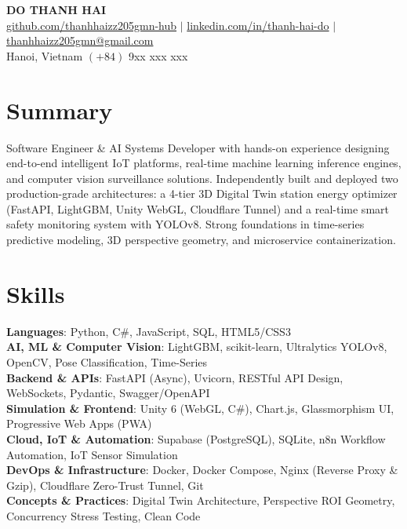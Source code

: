 \documentclass[letterpaper,10pt]{article}
\begin{document}
\begin{center}
    \textbf{\Huge \scshape DO THANH HAI} \\ \vspace{4pt}
    \small 
    \href{https://github.com/thanhhaizz205gmn-hub}{github.com/thanhhaizz205gmn-hub} $|$ 
    \href{https://linkedin.com/in/thanh-hai-do}{linkedin.com/in/thanh-hai-do} $|$ 
    \href{mailto:thanhhaizz205gmn@gmail.com}{thanhhaizz205gmn@gmail.com} \\ \vspace{2pt}
    \small Hanoi, Vietnam \quad $(+84)$ 9xx xxx xxx
\end{center}

\section{Summary}
\small{
Software Engineer \& AI Systems Developer with hands-on experience designing end-to-end intelligent IoT platforms, real-time machine learning inference engines, and computer vision surveillance solutions. Independently built and deployed two production-grade architectures: a 4-tier 3D Digital Twin station energy optimizer (FastAPI, LightGBM, Unity WebGL, Cloudflare Tunnel) and a real-time smart safety monitoring system with YOLOv8. Strong foundations in time-series predictive modeling, 3D perspective geometry, and microservice containerization.
}

\section{Skills}
\begin{itemize}[leftmargin=0.15in, label={}]
    \small{\item{
     \textbf{Languages}{: Python, C\#, JavaScript, SQL, HTML5/CSS3} \\
     \textbf{AI, ML \& Computer Vision}{: LightGBM, scikit-learn, Ultralytics YOLOv8, OpenCV, Pose Classification, Time-Series} \\
     \textbf{Backend \& APIs}{: FastAPI (Async), Uvicorn, RESTful API Design, WebSockets, Pydantic, Swagger/OpenAPI} \\
     \textbf{Simulation \& Frontend}{: Unity 6 (WebGL, C\#), Chart.js, Glassmorphism UI, Progressive Web Apps (PWA)} \\
     \textbf{Cloud, IoT \& Automation}{: Supabase (PostgreSQL), SQLite, n8n Workflow Automation, IoT Sensor Simulation} \\
     \textbf{DevOps \& Infrastructure}{: Docker, Docker Compose, Nginx (Reverse Proxy \& Gzip), Cloudflare Zero-Trust Tunnel, Git} \\
     \textbf{Concepts \& Practices}{: Digital Twin Architecture, Perspective ROI Geometry, Concurrency Stress Testing, Clean Code}
    }}
\end{itemize}
\end{document}
